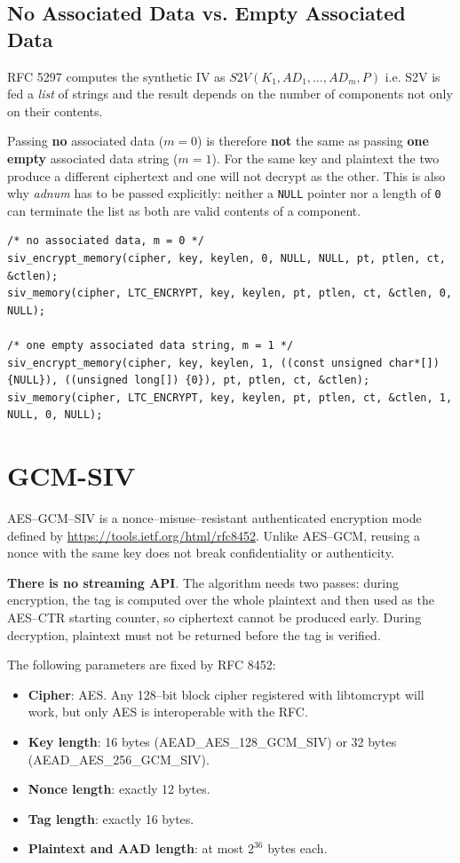 \documentclass[synpaper]{book}
\newcommand{\mysection}[1]    %
	{                   %
	\section{#1}
   \markboth{\textsf{www.libtom.net}}{\thesection ~ {#1}}
	}
\begin{document}
\subsection{No Associated Data vs. Empty Associated Data}
\label{SIV_zero_vs_empty_ad}

RFC 5297 computes the synthetic IV as $S2V(K_1, AD_1, \ldots, AD_m, P)$ i.e. S2V is fed a \textit{list} of strings
and the result depends on the number of components not only on their contents.

Passing \textbf{no} associated data ($m = 0$) is therefore \textbf{not} the same as passing \textbf{one empty}
associated data string ($m = 1$). For the same key and plaintext the two produce a different ciphertext and one
will not decrypt as the other. This is also why \textit{adnum} has to be passed explicitly: neither a \texttt{NULL}
pointer nor a length of \texttt{0} can terminate the list as both are valid contents of a component.

\begin{small}
\begin{verbatim}
/* no associated data, m = 0 */
siv_encrypt_memory(cipher, key, keylen, 0, NULL, NULL, pt, ptlen, ct, &ctlen);
siv_memory(cipher, LTC_ENCRYPT, key, keylen, pt, ptlen, ct, &ctlen, 0, NULL);

/* one empty associated data string, m = 1 */
siv_encrypt_memory(cipher, key, keylen, 1, ((const unsigned char*[]) {NULL}), ((unsigned long[]) {0}), pt, ptlen, ct, &ctlen);
siv_memory(cipher, LTC_ENCRYPT, key, keylen, pt, ptlen, ct, &ctlen, 1, NULL, 0, NULL);
\end{verbatim}
\end{small}

\mysection{GCM-SIV}
\label{GCM-SIV}

AES--GCM--SIV is a nonce--misuse--resistant authenticated encryption mode defined by \url{https://tools.ietf.org/html/rfc8452}.
Unlike AES--GCM, reusing a nonce with the same key does not break confidentiality or authenticity.

\textbf{There is no streaming API}. The algorithm needs two passes: during encryption, the tag is computed over the whole plaintext
and then used as the AES--CTR starting counter, so ciphertext cannot be produced early. During decryption, plaintext must not be
returned before the tag is verified.

The following parameters are fixed by RFC 8452:
\begin{itemize}
   \item \textbf{Cipher}: AES. Any 128--bit block cipher registered with libtomcrypt will work, but only AES is interoperable with the RFC.
   \item \textbf{Key length}: 16 bytes (AEAD\_AES\_128\_GCM\_SIV) or 32 bytes (AEAD\_AES\_256\_GCM\_SIV).
   \item \textbf{Nonce length}: exactly 12 bytes.
   \item \textbf{Tag length}: exactly 16 bytes.
   \item \textbf{Plaintext and AAD length}: at most $2^{36}$ bytes each.
\end{itemize}
\end{document}
